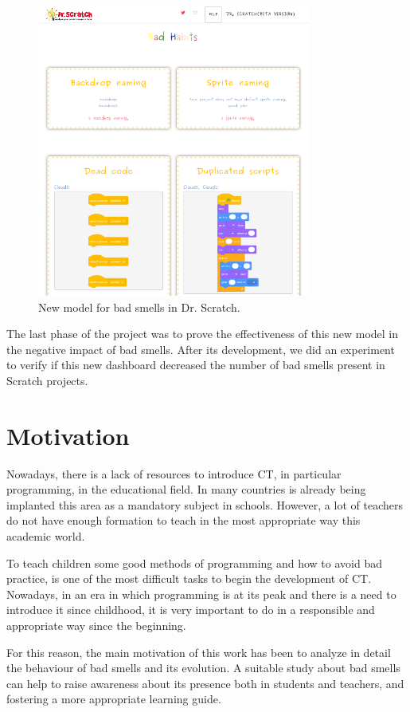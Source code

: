 \begin{figure}[h]
  \centering
  \includegraphics[width=9cm, keepaspectratio]{img/new_model.png}
  \caption{New model for bad smells in Dr. Scratch.}
  \label{fig:bad_smells}
\end{figure}

The last phase of the project was to prove the effectiveness of this new model in the negative impact of bad smells. After its development, we did an experiment to verify if this new dashboard decreased the number of bad smells present in Scratch projects.


\section{Motivation}
\label{sec:motivation}

Nowadays, there is a lack of resources to introduce CT, in particular programming, in the educational field. In many countries is already being implanted this area as a mandatory subject in schools. However, a lot of teachers do not have enough formation to teach in the most appropriate way this academic world. 

To teach children some good methods of programming and how to avoid bad practice, is one of the most difficult tasks to begin the development of CT. Nowadays, in an era in which programming is at its peak and there is a need to introduce it since childhood, it is very important to do in a responsible and appropriate way since the beginning. 

For this reason, the main motivation of this work has been to analyze in detail the behaviour of bad smells and its evolution. A suitable study about bad smells can help to raise awareness about its presence both in students and teachers, and fostering a more appropriate learning guide.


